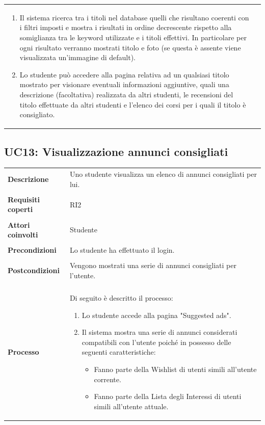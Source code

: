 \documentclass[10pt,a4paper]{article}
\begin{document}
\begin{tabular}{lp{}}
\begin{enumerate}
			\item Il sistema ricerca tra i titoli nel database quelli che risultano coerenti con i filtri imposti e mostra i risultati in ordine decrescente rispetto alla somiglianza tra le keyword utilizzate e i titoli effettivi. In particolare per ogni risultato verranno mostrati titolo e foto (se questa è assente viene visualizzata un'immagine di default).
			\item Lo studente può accedere alla pagina relativa ad un qualsiasi titolo mostrato per visionare eventuali informazioni aggiuntive, quali una descrizione (facoltativa) realizzata da altri studenti, le recensioni del titolo effettuate da altri studenti e l'elenco dei corsi per i quali il titolo è consigliato.
		\end{enumerate}
	\end{tabular}
	
	\subsection{UC13: Visualizzazione annunci consigliati}
	\begin{tabular}{lp{}}
		\textbf{Descrizione}&Uno studente visualizza un elenco di annunci consigliati per lui.\\
		\\
		\textbf{Requisiti coperti}&RI2\\
		\\
		\textbf{Attori coinvolti}&Studente\\
		\\
		\textbf{Precondizioni}&Lo studente ha effettuato il login.\\
		\\
		\textbf{Postcondizioni}&Vengono mostrati una serie di annunci consigliati per l'utente.\\
		\\
		\textbf{Processo}&Di seguito è descritto il processo:
		\begin{enumerate}
			\item Lo studente accede alla pagina "Suggested ads".
			\item Il sistema mostra una serie di annunci considerati compatibili con l'utente poiché in possesso delle seguenti caratteristiche:
			\begin{itemize}
				\item Fanno parte della Wishlist di utenti simili all'utente corrente.
				\item Fanno parte della Lista degli Interessi di utenti simili all'utente attuale.		
			\end{itemize}
		\end{enumerate}
	\end{tabular}
	
\end{document}
